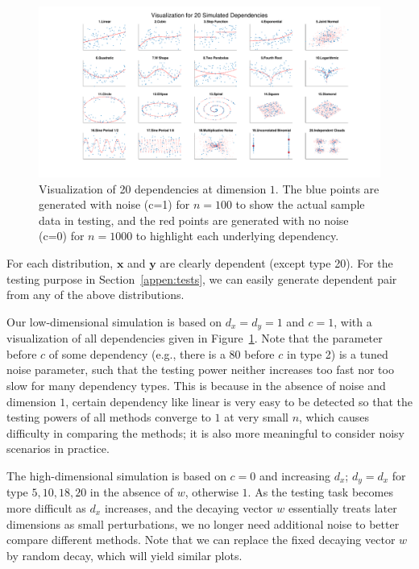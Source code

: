 \documentclass[11pt]{article}
\providecommand{\mb}[1]{\boldsymbol{#1}}
\begin{document}
\begin{figure}[htbp]
\includegraphics[trim={5cm 0 3.5cm 0},clip, width=1.0\textwidth]{../Figures/Fig0}
\caption{Visualization of 20 dependencies at dimension $1$. The blue points are generated with noise (c=1) for $n=100$ to show the actual sample data in testing, and the red points are generated with no noise (c=0) for $n=1000$ to highlight each underlying dependency.
}
\label{fig0}
\end{figure}

For each distribution, $\mb{x}$ and $\mb{y}$ are clearly dependent (except type 20). For the testing purpose in Section~\ref{appen:tests}, we can easily generate dependent pair from any of the above distributions.

Our low-dimensional simulation is based on $d_{x}=d_{y}=1$ and $c=1$, with a visualization of all dependencies given in Figure~\ref{fig0}. Note that the parameter before $c$ of some dependency (e.g., there is a $80$ before $c$ in type 2) is a tuned noise parameter, such that the testing power neither increases too fast nor too slow for many dependency types. This is because in the absence of noise and dimension $1$, certain dependency like linear is very easy to be detected so that the testing powers of all methods converge to $1$ at very small $n$, which causes difficulty in comparing the methods; it is also more meaningful to consider noisy scenarios in practice. 

The high-dimensional simulation is based on $c=0$ and increasing $d_{x}$; $d_{y}=d_{x}$ for type $5,10,18,20$ in the absence of $w$, otherwise $1$. As the testing task becomes more difficult as $d_{x}$ increases, and the decaying vector $w$ essentially treats later dimensions as small perturbations, we no longer need additional noise to better compare different methods. Note that we can replace the fixed decaying vector $w$ by random decay, which will yield similar plots.
\end{document}
